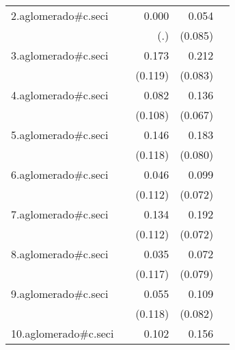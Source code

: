 {\begin{longtable}{l*{4}{D{.}{.}{-1}}}
\addlinespace
2.aglomerado#c.seci&                     &       0.000         &       0.054         &                     \\
            &                     &         (.)         &     (0.085)         &                     \\
\addlinespace
3.aglomerado#c.seci&                     &       0.173         &       0.212\sym{*}  &                     \\
            &                     &     (0.119)         &     (0.083)         &                     \\
\addlinespace
4.aglomerado#c.seci&                     &       0.082         &       0.136\sym{*}  &                     \\
            &                     &     (0.108)         &     (0.067)         &                     \\
\addlinespace
5.aglomerado#c.seci&                     &       0.146         &       0.183\sym{*}  &                     \\
            &                     &     (0.118)         &     (0.080)         &                     \\
\addlinespace
6.aglomerado#c.seci&                     &       0.046         &       0.099         &                     \\
            &                     &     (0.112)         &     (0.072)         &                     \\
\addlinespace
7.aglomerado#c.seci&                     &       0.134         &       0.192\sym{**} &                     \\
            &                     &     (0.112)         &     (0.072)         &                     \\
\addlinespace
8.aglomerado#c.seci&                     &       0.035         &       0.072         &                     \\
            &                     &     (0.117)         &     (0.079)         &                     \\
\addlinespace
9.aglomerado#c.seci&                     &       0.055         &       0.109         &                     \\
            &                     &     (0.118)         &     (0.082)         &                     \\
\addlinespace
10.aglomerado#c.seci&                     &       0.102         &       0.156\sym{*}  &                     \\

\end{longtable}}
